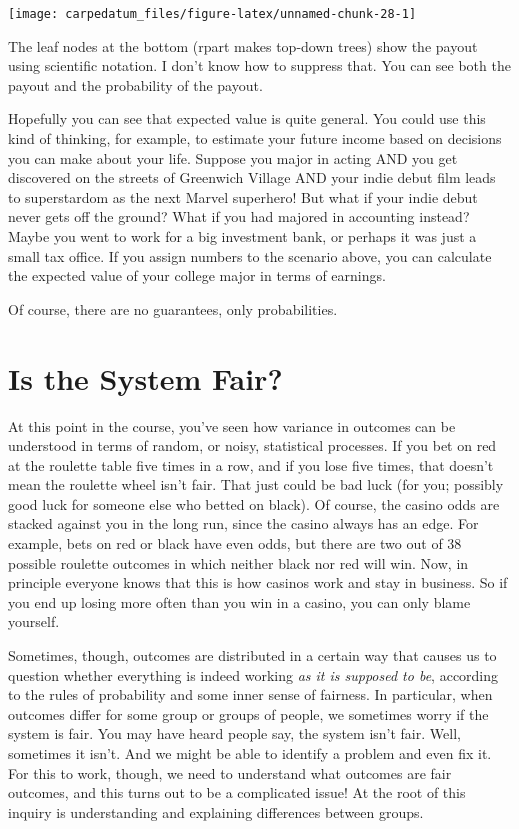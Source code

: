 \documentclass[
  openany]{book}
\begin{document}
\begin{center}\texttt{[image: carpedatum\_files/figure-latex/unnamed-chunk-28-1]} \end{center}

The leaf nodes at the bottom (rpart makes top-down trees) show the payout using scientific notation. I don't know how to suppress that. You can see both the payout and the probability of the payout.

Hopefully you can see that expected value is quite general. You could use this kind of thinking, for example, to estimate your future income based on decisions you can make about your life. Suppose you major in acting AND you get discovered on the streets of Greenwich Village AND your indie debut film leads to superstardom as the next Marvel superhero! But what if your indie debut never gets off the ground? What if you had majored in accounting instead? Maybe you went to work for a big investment bank, or perhaps it was just a small tax office. If you assign numbers to the scenario above, you can calculate the expected value of your college major in terms of earnings.

Of course, there are no guarantees, only probabilities.

\hypertarget{is-the-system-fair}{%
\chapter*{Is the System Fair?}\label{is-the-system-fair}}

At this point in the course, you've seen how variance in outcomes can be understood in terms of random, or noisy, statistical processes. If you bet on red at the roulette table five times in a row, and if you lose five times, that doesn't mean the roulette wheel isn't fair. That just could be bad luck (for you; possibly good luck for someone else who betted on black). Of course, the casino odds are stacked against you in the long run, since the casino always has an edge. For example, bets on red or black have even odds, but there are two out of 38 possible roulette outcomes in which neither black nor red will win. Now, in principle everyone knows that this is how casinos work and stay in business. So if you end up losing more often than you win in a casino, you can only blame yourself.

Sometimes, though, outcomes are distributed in a certain way that causes us to question whether everything is indeed working \emph{as it is supposed to be}, according to the rules of probability and some inner sense of fairness. In particular, when outcomes differ for some group or groups of people, we sometimes worry if the system is fair. You may have heard people say, the system isn't fair. Well, sometimes it isn't. And we might be able to identify a problem and even fix it. For this to work, though, we need to understand what outcomes are fair outcomes, and this turns out to be a complicated issue! At the root of this inquiry is understanding and explaining differences between groups.
\end{document}
